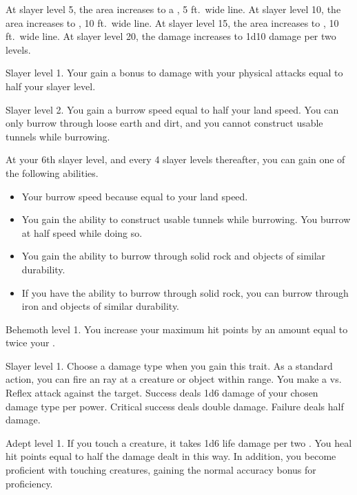     At slayer level 5, the area increases to a \arealarge, 5 ft.\ wide line.
    At slayer level 10, the area increases to \arealarge, 10 ft.\ wide line.
    At slayer level 15, the area increases to \areahuge, 10 ft.\ wide line.
    At slayer level 20, the damage increases to 1d10 damage per two levels.

    \featpre Slayer level 1.
    \featben Your gain a bonus to damage with your physical attacks equal to half your slayer level.

    \featpre Slayer level 2.
    \featben You gain a burrow speed equal to half your land speed.
    You can only burrow through loose earth and dirt, and you cannot construct usable tunnels while burrowing.

    At your 6th slayer level, and every 4 slayer levels thereafter, you can gain one of the following abilities.
    \begin{itemize}
        \item Your burrow speed because equal to your land speed.
        \item You gain the ability to construct usable tunnels while burrowing.
            You burrow at half speed while doing so.
        \item You gain the ability to burrow through solid rock and objects of similar durability.
        \item If you have the ability to burrow through solid rock, you can burrow through iron and objects of similar durability.
    \end{itemize}

    \featpre Behemoth level 1.
    \featben You increase your maximum hit points by an amount equal to twice your .

    \featpre Slayer level 1.
     Choose a damage type when you gain this trait.
    \featben As a standard action, you can fire an ray at a creature or object within \rngclose range.
    You make a  vs. Reflex attack against the target.
    Success deals 1d6 damage of your chosen damage type per power.
    Critical success deals double damage.
    Failure deals half damage.

    \featpre Adept level 1.
    \featben If you touch a creature, it takes 1d6 life damage  per two .
    You heal hit points equal to half the damage dealt in this way.
    In addition, you become proficient with touching creatures, gaining the normal  accuracy bonus for proficiency.

